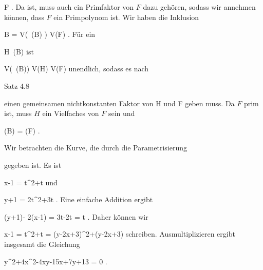 { {}
 {F } {}
 {} {} {} {.}
Da
ist, muss auch ein Primfaktor von $F$ dazu gehören, sodass wir annehmen können, dass $F$ ein Primpolynom ist. Wir haben die Inklusion

\mavergleichskettedisp
{\vergleichskette
{B
}
{ \subseteq} { 
}
{ =} { V(  \,(B)  )
}
{ \subseteq} { V(F)
}
{ } {
}
}
{}{}{.}
Für ein

\mavergleichskette
{\vergleichskette
{ H
}
{ \in }{  \,(B)
}
{  }{
}
{    }{
}
{   }{
}
}
{}{}{}
ist

\mavergleichskettedisp
{\vergleichskette
{ V( \,(B))
}
{ \subseteq} { V(H) \cap V(F)
}
{ } {
}
{ } {
}
{ } {
}
}
{}{}{}
unendlich, sodass es nach

Satz 4.8

einen gemeinsamen nichtkonstanten Faktor von
\mathkor {} {H} {und} {F} {}
geben muss. Da $F$ prim ist, muss $H$ ein Vielfaches von $F$ sein und

\mavergleichskette
{\vergleichskette
{  (B)
}
{ = }{ (F)
}
{  }{
}
{    }{
}
{   }{
}
}
{}{}{.}




}




{





Wir betrachten die Kurve, die durch die Parametrisierung

 {  }

gegeben ist. Es ist

\mavergleichskette
{\vergleichskette
{ x-1
}
{ = }{ t^2+t
}
{  }{
}
{    }{
}
{   }{
}
}
{}{}{}
und

\mavergleichskette
{\vergleichskette
{ y+1
}
{ = }{ 2t^2+3t
}
{  }{
}
{    }{
}
{   }{
}
}
{}{}{.}
Eine einfache Addition ergibt

\mavergleichskettedisp
{\vergleichskette
{ (y+1)- 2(x-1)
}
{ =} { 3t-2t
}
{ =} { t
}
{ } {
}
{ } {
}
}
{}{}{.}
Daher können wir

\mavergleichskettedisp
{\vergleichskette
{ x-1
}
{ =} {t^2+t
}
{ =} {(y-2x+3)^2+(y-2x+3)
}
{ } {
}
{ } {
}
}
{}{}{}
schreiben. Ausmultiplizieren ergibt insgesamt die Gleichung

\mavergleichskettedisp
{\vergleichskette
{ y^2+4x^2-4xy-15x+7y+13
}
{ =} { 0
}
{ } {
}
{ } {
}
{ } {
}
}
{}{}{.}





}

